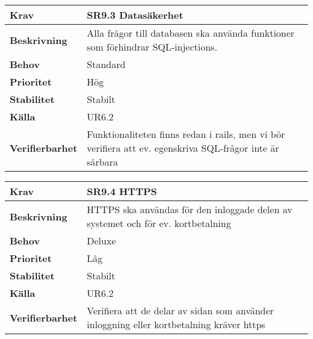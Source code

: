 \documentclass[a4paper, twoside, 11pt, titlepage]{article}
\begin{document}
	\begin {table} [ht] \begin{tabular} { p{2.6cm} p{12.5cm} }
		\hline
		\sffamily\textbf{Krav} & \sffamily\textbf{SR9.3 Datasäkerhet } \\
		\hline
		\sffamily\textbf{Beskrivning} & Alla frågor till databasen ska använda funktioner som förhindrar SQL-injections.  \\
		\hline
		\sffamily\textbf{Behov} & Standard  \\
		\hline
		\sffamily\textbf{Prioritet} & Hög  \\
		\hline
		\sffamily\textbf{Stabilitet} & Stabilt  \\
		\hline
		\sffamily\textbf{Källa} & UR6.2  \\
		\hline
		\sffamily\textbf{Verifierbarhet} & Funktionaliteten finns redan i rails, men vi bör verifiera att ev. egenskriva SQL-frågor inte är sårbara  \\
		\hline
	\end{tabular} \end{table} \FloatBarrier
	\vspace{6mm}

	\begin {table} [ht] \begin{tabular} { p{2.6cm} p{12.5cm} }
		\hline
		\sffamily\textbf{Krav} & \sffamily\textbf{SR9.4 HTTPS  } \\
		\hline
		\sffamily\textbf{Beskrivning} & HTTPS ska användas för den inloggade delen av systemet och för ev. kortbetalning  \\
		\hline
		\sffamily\textbf{Behov} & Deluxe  \\
		\hline
		\sffamily\textbf{Prioritet} & Låg  \\
		\hline
		\sffamily\textbf{Stabilitet} & Stabilt  \\
		\hline
		\sffamily\textbf{Källa} & UR6.2  \\
		\hline
		\sffamily\textbf{Verifierbarhet} & Verifiera att de delar av sidan som använder inloggning eller kortbetalning kräver https  \\
		\hline
	\end{tabular} \end{table} \FloatBarrier
	\vspace{6mm}
\end{document}
